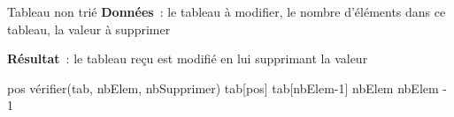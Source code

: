\begin{Fiche}{Tableau non trié}
	\textbf{Données}~: le tableau à modifier, le nombre d'éléments dans ce tableau, la valeur à supprimer
		
	\textbf{Résultat}~: le tableau reçu est modifié en lui supprimant la valeur
		
		\begin{LDA}
				\Let pos \Gets vérifier(tab, nbElem, nbSupprimer)
					\Let tab[pos] \Gets tab[nbElem-1]
					\Let nbElem \Gets nbElem - 1
				\EndIf			
			\EndAlgo
		\end{LDA}



	
\end{Fiche}

